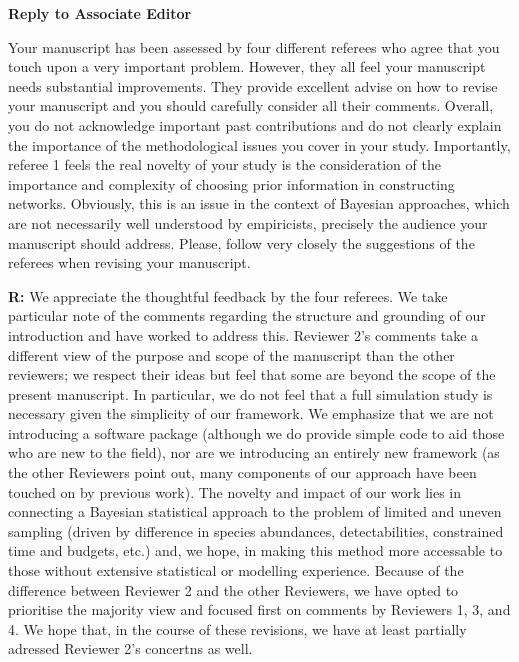\documentclass[12pt]{letter}
\newenvironment{refquote}{\bigskip \begin{it}}{\end{it}\smallskip}
\begin{document}
\newpage

\setcounter{page}{1}



{\Large \bf Reply to Associate Editor}


	\begin{refquote}
	Your manuscript has been assessed by four different referees who agree that you touch upon a very important problem. However, they all feel your manuscript needs substantial improvements. They provide excellent advise on how to revise your manuscript and you should carefully consider all their comments. Overall, you do not acknowledge important past contributions and do not clearly explain the importance of the methodological issues you cover in your study. Importantly, referee 1 feels the real novelty of your study is the consideration of the importance and complexity of choosing prior information in constructing networks. Obviously, this is an issue in the context of Bayesian approaches, which are not necessarily well understood by empiricists, precisely the audience your manuscript should address. Please, follow very closely the suggestions of the referees when revising your manuscript.

	\end{refquote}

	\textbf{R:} We appreciate the thoughtful feedback by the four referees. We take particular note of the comments regarding the structure and grounding of our introduction and have worked to address this. Reviewer 2's comments take a different view of the purpose and scope of the manuscript than the other reviewers; we respect their ideas but feel that some are beyond the scope of the present manuscript. In particular, we do not feel that a full simulation study is necessary given the simplicity of our framework. We emphasize that we are not introducing a software package (although we do provide simple code to aid those who are new to the field), nor are we introducing an entirely new framework (as the other Reviewers point out, many components of our approach have been touched on by previous work). The novelty and impact of our work lies in connecting a Bayesian statistical approach to the problem of limited and uneven sampling (driven by difference in species abundances, detectabilities, constrained time and budgets, etc.) and, we hope, in making this method more accessable to those without extensive statistical or modelling experience. Because of the difference between Reviewer 2 and the other Reviewers, we have opted to prioritise the majority view and focused first on comments by Reviewers 1, 3, and 4. We hope that, in the course of these revisions, we have at least partially adressed Reviewer 2's concertns as well. 
\end{document}
